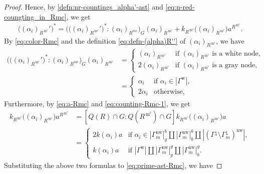\documentclass[10pt,a4paper]{amsart}
\newcommand{\mc}{\, \underline{\mathrm{m}}^c}
\newcommand{\nw}{\mathrm{nw}}
\newcommand{\w}{\mathrm{w}}
\begin{document}
\begin{proof}
Hence, by \eqref{defn:nr-countings_alpha'-ast} and \eqref{eq:n-red-coungting_in_Rmc},
we get 
\begin{equation}\label{eq:prime-ast-Rmc}
\begin{aligned}
\big((\alpha_i)_{R^{\mc}}'\big)^*=
\big(\big((\alpha_i)_{R^{\mc}}'\big)^*:(\alpha_i)_{R^{mc}}\big)_G(\alpha_i)_{R^{\mc}}
+k_{R^{\mc}}\big((\alpha_i)_{R^{\mc}}\big)a^{R^{\mc}}.
\end{aligned}
\end{equation}
By \eqref{eq:color-Rmc} and the definition \eqref{eq:defn-(alpha)R''} 
of $(\alpha_i)_{R^{\mc}}$, we have
\begin{align*}
\big(\big((\alpha_i)_{R^{\mc}}'\big)^*:(\alpha_i)_{R^{mc}}\big)_G(\alpha_i)_{R^{\mc}}
&=\begin{cases}
(\alpha_i)_{R^{\mc}} & \text{if $(\alpha_i)_{R^{\mc}}$ is a white node},\\
2(\alpha_i)_{R^{\mc}} & \text{if $(\alpha_i)_{R^{\mc}}$ is a gray node},
\end{cases}\\
&=\begin{cases}
\alpha_i & \text{if $\alpha_i\in |\Gamma^\w|$},\\
2\alpha_i & \text{otherwise},
\quad 
\end{cases}
\end{align*}
Furthermore, by \eqref{eq:a-Rmc} and \eqref{eq:counting-Rmc-1}, we get 
\begin{align*}
k_{R^{\mc}}\big((\alpha_i)_{R^{\mc}}\big)a^{R^{\mc}} 
&=[Q(R)\cap G:Q(R^{\mc})\cap G]k_{R^{\mc}}\big((\alpha_i)_{R^{\mc}}\big)a\\
&=\begin{cases}
2k(\alpha_i)a & \text{if $\alpha_i\in 
|\Gamma_m^\nw|_g^b
\amalg |\Gamma_m^\nw|_b^b\amalg 
|(\Gamma^{\downarrow}\setminus 
\Gamma_m^{\downarrow})^\nw|$},\\
k(\alpha_i)a & \text{if $|\Gamma^\w|\amalg 
|\Gamma_m^\nw|_g^g\amalg |\Gamma_m^\nw|_b^g$}.
\end{cases}
\end{align*}
Substituting the above two formulas to \eqref{eq:prime-ast-Rmc}, we have

\end{proof}
\end{document}
